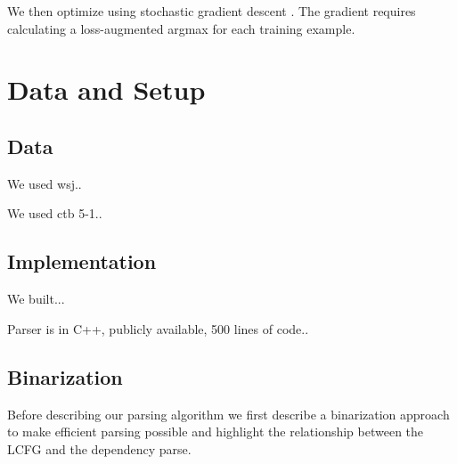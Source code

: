 \documentclass[11pt,letterpaper]{article}
\begin{document}
We then optimize using stochastic gradient descent \cite{}. The gradient requires calculating a loss-augmented argmax for each training example.


















\section{Data and Setup}


\subsection{Data}

We used wsj..

We used ctb 5-1..




\subsection{Implementation}

We built...

Parser is in C++, publicly available, 500 lines of code..


\subsection{Binarization}

Before describing our parsing algorithm we first describe a binarization approach to make efficient parsing possible and highlight the relationship between the LCFG and the dependency parse.
\end{document}
